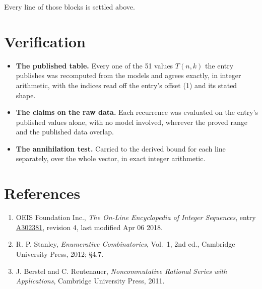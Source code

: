 \documentclass[11pt]{article}
\theoremstyle{definition}
\begin{document}
Every line of those blocks is settled above.

\section{Verification}

\begin{itemize}

\item {\bfseries The published table.} Every one of the 51 values $T(n,k)$ the entry publishes was recomputed from the models and agrees exactly, in integer arithmetic, with the indices read off the entry's offset (1) and its stated shape.

\item {\bfseries The claims on the raw data.} Each recurrence was evaluated on the entry's published values alone, with no model involved, wherever the proved range and the published data overlap.

\item {\bfseries The annihilation test.} Carried to the derived bound for each line separately, over the whole vector, in exact integer arithmetic.

\end{itemize}

\section{References}

\begin{enumerate}

\item OEIS Foundation Inc., \emph{The On-Line Encyclopedia of Integer Sequences}, entry \href{https://oeis.org/A302381}{A302381}, revision 4, last modified Apr 06 2018.

\item R. P. Stanley, \emph{Enumerative Combinatorics}, Vol.~1, 2nd ed., Cambridge University Press, 2012; \S4.7.

\item J. Berstel and C. Reutenauer, \emph{Noncommutative Rational Series with Applications}, Cambridge University Press, 2011.

\end{enumerate}
\end{document}
